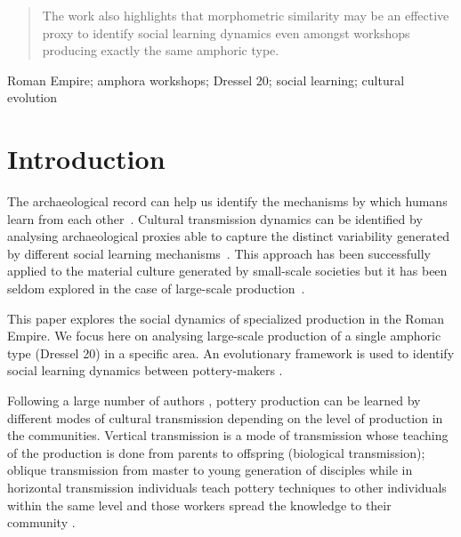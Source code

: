 \documentclass[review]{elsarticle}
\begin{document}
\begin{frontmatter}
\begin{abstract}
The work also highlights that morphometric similarity may be an effective proxy to identify social learning dynamics even amongst workshops producing exactly the same amphoric type. 

\end{abstract}


\begin{keyword}
Roman Empire; amphora workshops; Dressel 20; social learning; cultural evolution
\end{keyword}

\end{frontmatter}

\linenumbers

\section{Introduction}

The archaeological record can help us identify the mechanisms by which humans learn from each other~\citep{richerson2005not,eerkens_jelmer_cultural_2007}. Cultural transmission dynamics can be identified by analysing archaeological proxies able to capture the distinct variability generated by different social learning mechanisms~\citep{shennan_ceramic_2001,eerkens_jelmer_cultural_2005, gandon_copying_2014}. This approach has been successfully applied to the material culture generated by small-scale societies but it has been seldom explored in the case of large-scale production~\citep{shennan_isolation-by-distance_2015}.

This paper explores the social dynamics of specialized production in the Roman Empire. We focus here on analysing large-scale production of a single amphoric type (Dressel 20) in a specific area. An evolutionary framework is used to identify social learning dynamics between pottery-makers \citep{shennan_evolution_2008,mesoudi_cultural_2015}. 

Following a large number of authors \citep{neff1992ceramics,shennan_genes_2002,bowser_learning_2008,hosfield_modes_2009}, pottery production can be learned by different modes of cultural transmission depending on the level of production in the communities. Vertical transmission is a mode of transmission whose teaching of the production is done from parents to offspring (biological transmission); oblique transmission from master to young generation of disciples while in horizontal transmission individuals teach pottery techniques to other individuals within the same level and those workers spread the knowledge to their community \citep{cavalli-sforza_cultural_1981, acerbi_cultural_2006}.
\end{document}
